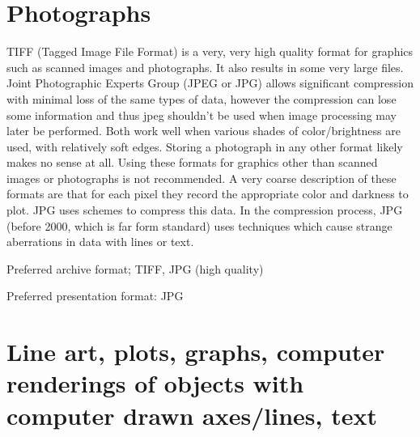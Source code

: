\documentclass[a4paper]{article}
\begin{document}
\section{Photographs%
  \label{photographs}%
}

TIFF (Tagged Image File Format) is a very, very high quality format for
graphics such as scanned images and photographs. It also results in some
very large files. Joint Photographic Experts Group (JPEG or JPG) allows
significant compression with minimal loss of the same types of data,
however the compression can lose some information and thus jpeg
shouldn’t be used when image processing may later be performed. Both
work well when various shades of color/brightness are used, with
relatively soft edges. Storing a photograph in any other format likely
makes no sense at all. Using these formats for graphics other than
scanned images or photographs is not recommended. A very coarse
description of these formats are that for each pixel they record the
appropriate color and darkness to plot. JPG uses schemes to compress
this data. In the compression process, JPG (before 2000, which is far
form standard) uses techniques which cause strange aberrations in data
with lines or text.
\setcounter{listcnt0}{0}
\begin{list}{.}
{
\setlength{\rightmargin}{\leftmargin}
}

\item Preferred archive format; TIFF, JPG (high quality)

\item Preferred presentation format: JPG
\end{list}


\section{Line art, plots, graphs, computer renderings of objects with computer drawn axes/lines, text%
  \label{line-art-plots-graphs-computer-renderings-of-objects-with-computer-drawn-axes-lines-text}%
}
\end{document}
